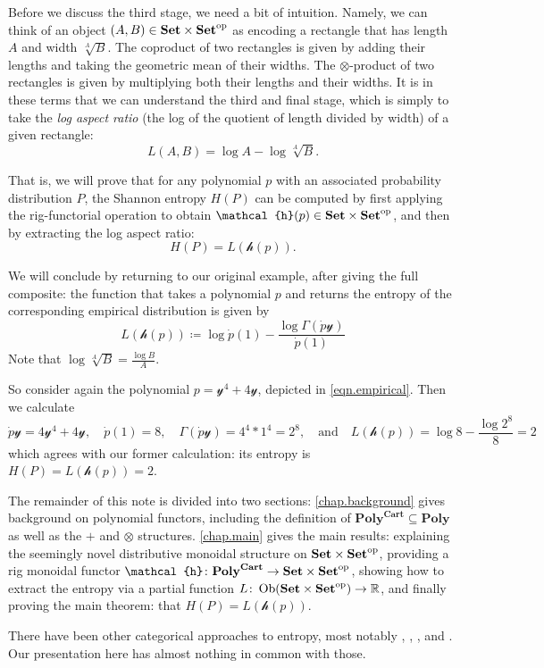 \documentclass[11pt, one side, article]{memoir}
\theoremstyle{definition}
\theoremstyle{plain}
\renewcommand{\ss}{\subseteq}
\DeclareMathOperator{\ob}{Ob}
\newcommand{\Cat}[1]{\mathbf{#1}}%
\newcommand{\op}{^\tn{op}}
\newcommand{\tn}[1]{\textnormal{#1}}
\newcommand{\rr}{\mathbb{R}}
\newcommand{\smset}{\Cat{Set}}
\newcommand{\yon}{\mathcal{y}}
\newcommand{\poly}{\Cat{Poly}}
\newcommand{\polycart}{\poly^{\Cat{Cart}}}
\newcommand{\hh}{\mathcal{h}}
\newcommand{\0}{\textsf{0}}
\newcommand{\1}{\tn{\textsf{1}}}
\newcommand{\qand}{\quad\text{and}\quad}
\begin{document}
Before we discuss the third stage, we need a bit of intuition. Namely, we can think of an object $(A,B)\in\smset\times\smset\op$ as encoding a rectangle that has length $A$ and width $\sqrt[A]{B}$. The coproduct of two rectangles is given by adding their lengths and taking the geometric mean of their widths. The $\otimes$-product of two rectangles is given by multiplying both their lengths and their widths. It is in these terms that we can understand the third and final stage, which is simply to take the \emph{log aspect ratio} (the log of the quotient of length divided by width) of a given rectangle:
\[L(A,B)=\log A-\log\sqrt[A]{B}.\]

That is, we will prove that for any polynomial $p$ with an associated probability distribution $P$, the Shannon entropy $H(P)$ can be computed by first applying the rig-functorial operation to obtain $\hh(p)\in\smset\times\smset\op$, and then by extracting the log aspect ratio:
\[
H(P)=L(\hh(p)).
\]

We will conclude by returning to our original example, after giving the full composite: the function that takes a polynomial $p$ and returns the entropy of the corresponding empirical distribution is given by
\[
  L(\hh(p))\coloneqq\log \dot{p}(1)-\frac{\log\Gamma(\dot{p}\yon)}{\dot{p}(1)}
\]
Note that $\log\sqrt[A]{B}=\frac{\log B}{A}$.

So consider again the polynomial $p=\yon^4+4\yon$, depicted in \eqref{eqn.empirical}. Then we calculate
\[
\dot{p}\yon=4\yon^4+4\yon
,\quad
\dot{p}(1)=8
,\quad
\Gamma(\dot{p}\yon)=4^4*1^4=2^8
,\qand 
L(\hh(p))=\log 8-\frac{\log 2^8}{8}=2
\]
which agrees with our former calculation: its entropy is $H(P)=L(\hh(p))=2$. 

The remainder of this note is divided into two sections: \cref{chap.background} gives background on polynomial functors, including the definition of $\polycart\ss\poly$ as well as the $+$ and $\otimes$ structures. \cref{chap.main} gives the main results: explaining the seemingly novel distributive monoidal structure on $\smset\times\smset\op$, providing a rig monoidal functor $\hh\colon\polycart\to\smset\times\smset\op$, showing how to extract the entropy via a partial function $L\colon\ob(\smset\times\smset\op)\to\rr$, and finally proving the main theorem: that $H(P)=L(\hh(p))$.

There have been other categorical approaches to entropy, most notably \cite{baez2011characterization}, \cite{baez2014bayesian}, \cite{leinster2021entropy}, and \cite{parzygnat2022functorial}. Our presentation here has almost nothing in common with those. 
\end{document}
